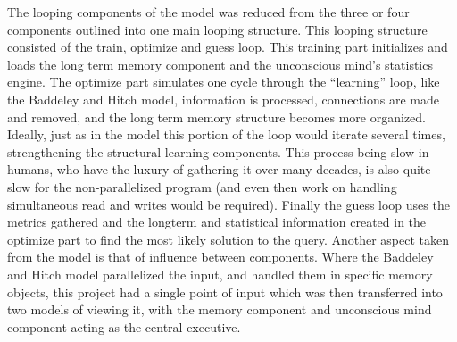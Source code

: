 The looping components of the model was reduced from the three or four components outlined into one main looping structure.  This looping structure consisted of the train, optimize and guess loop.  This training part initializes and loads the long term memory component and the unconscious mind's statistics engine.  The optimize part simulates one cycle through the ``learning'' loop, like the Baddeley and Hitch model, information is processed, connections are made and removed, and the long term memory structure becomes more organized.  Ideally, just as in the model this portion of the loop would iterate several times, strengthening the structural learning components. This process being slow in humans, who have the luxury of gathering it over many decades, is also quite slow for the non-parallelized program (and even then work on handling simultaneous read and writes would be required). Finally the guess loop uses the metrics gathered and the longterm and statistical information created in the optimize part to find the most likely solution to the query. Another aspect taken from the model is that of influence between components.  Where the Baddeley and Hitch model parallelized the input, and handled them in specific memory objects, this project had a single point of input which was then transferred into two models of viewing it, with the memory component and unconscious mind component acting as the central executive. 

